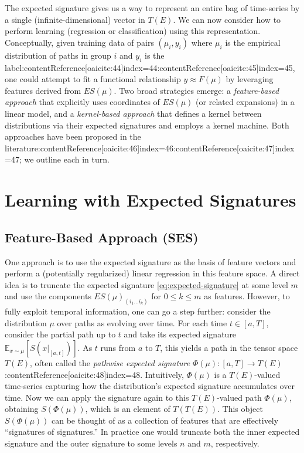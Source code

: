 \documentclass[11pt]{article}
\begin{document}
The expected signature gives us a way to represent an entire bag of time-series by a single (infinite-dimensional) vector in $T(E)$. We can now consider how to perform learning (regression or classification) using this representation. Conceptually, given training data of pairs $(\mu_i, y_i)$ where $\mu_i$ is the empirical distribution of paths in group $i$ and $y_i$ is the label:contentReference[oaicite:44]{index=44}:contentReference[oaicite:45]{index=45}, one could attempt to fit a functional relationship $y \approx F(\mu)$ by leveraging features derived from $ES(\mu)$. Two broad strategies emerge: a \emph{feature-based approach} that explicitly uses coordinates of $ES(\mu)$ (or related expansions) in a linear model, and a \emph{kernel-based approach} that defines a kernel between distributions via their expected signatures and employs a kernel machine. Both approaches have been proposed in the literature:contentReference[oaicite:46]{index=46}:contentReference[oaicite:47]{index=47}; we outline each in turn.

\section{Learning with Expected Signatures}
\subsection{Feature-Based Approach (SES)}
One approach is to use the expected signature as the basis of feature vectors and perform a (potentially regularized) linear regression in this feature space. A direct idea is to truncate the expected signature \eqref{eq:expected-signature} at some level $m$ and use the components $ES(\mu)_{(i_1\ldots i_k)}$ for $0\le k \le m$ as features. However, to fully exploit temporal information, one can go a step further: consider the distribution $\mu$ over paths as evolving over time. For each time $t \in [a,T]$, consider the partial path up to $t$ and take its expected signature $\mathbb{E}_{x\sim \mu}[S(x|_{[a,t]})]$. As $t$ runs from $a$ to $T$, this yields a path in the tensor space $T(E)$, often called the \emph{pathwise expected signature} $\Phi(\mu): [a,T] \to T(E)$:contentReference[oaicite:48]{index=48}. Intuitively, $\Phi(\mu)$ is a $T(E)$-valued time-series capturing how the distribution’s expected signature accumulates over time. Now we can apply the signature again to this $T(E)$-valued path $\Phi(\mu)$, obtaining $S(\Phi(\mu))$, which is an element of $T(T(E))$. This object $S(\Phi(\mu))$ can be thought of as a collection of features that are effectively “signatures of signatures.” In practice one would truncate both the inner expected signature and the outer signature to some levels $n$ and $m$, respectively.
\end{document}
